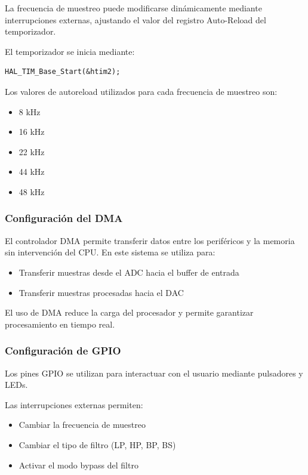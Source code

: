\documentclass[12pt]{article}
\begin{document}
	La frecuencia de muestreo puede modificarse dinámicamente mediante interrupciones externas, ajustando el valor del registro Auto-Reload del temporizador.

	El temporizador se inicia mediante:

	\begin{lstlisting}[style=mystyle]
	HAL_TIM_Base_Start(&htim2);
	\end{lstlisting}

	Los valores de autoreload utilizados para cada frecuencia de muestreo son:

	\begin{itemize}
	\item 8 kHz
	\item 16 kHz
	\item 22 kHz
	\item 44 kHz
	\item 48 kHz
	\end{itemize}

	\subsubsection{Configuración del DMA}
	El controlador DMA permite transferir datos entre los periféricos y la memoria sin intervención del CPU. En este sistema se utiliza para:

	\begin{itemize}
	\item Transferir muestras desde el ADC hacia el buffer de entrada
	\item Transferir muestras procesadas hacia el DAC
	\end{itemize}

	El uso de DMA reduce la carga del procesador y permite garantizar procesamiento en tiempo real.

	\subsubsection{Configuración de GPIO}
	Los pines GPIO se utilizan para interactuar con el usuario mediante pulsadores y LEDs.

	Las interrupciones externas permiten:

	\begin{itemize}
	\item Cambiar la frecuencia de muestreo
	\item Cambiar el tipo de filtro (LP, HP, BP, BS)
	\item Activar el modo bypass del filtro
	\end{itemize}
\end{document}
